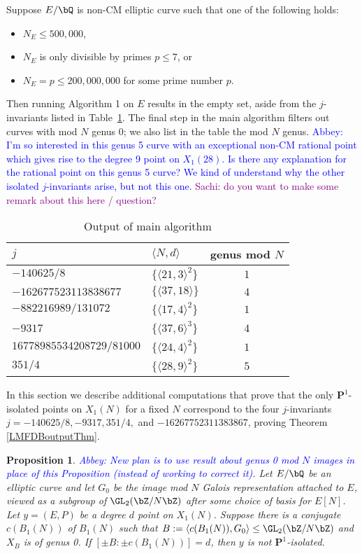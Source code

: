 \documentclass[11pt,reqno]{amsart}
\theoremstyle{plain}
\newtheorem{proposition}[theorem]{Proposition}
\theoremstyle{definition}
\newcommand{\Q}{\bQ}
\newcommand{\Z}{\bZ}
\newcommand{\PP}{\mathbf P}
\newcommand{\abbey}[1]{\textcolor{blue}{Abbey: #1}}
\newcommand{\sachi}[1]{\textcolor{purple}{Sachi: #1}}
\begin{document}
Suppose $E/\Q$ is non-CM elliptic curve such that one of the following holds:
\begin{itemize}
    \item$N_E \leq 500{,}000$,
    \item $N_E$ is only divisible by primes $p \leq 7$, or
    \item $N_E=p \leq 200{,}000{,}000$ for some prime number $p$.
\end{itemize} Then running Algorithm 1 on $E$ results in the empty set, aside from the $j$-invariants listed in Table~\ref{table:imagegt0}. The final step in the main algorithm filters out curves with mod $N$ genus $0$; we also list in the table the mod $N$ genus. \abbey{I'm so interested in this genus 5 curve with an exceptional non-CM rational point which gives rise to the degree 9 point on $X_1(28)$. Is there any explanation for the rational point on this genus 5 curve? We kind of understand why the other isolated $j$-invariants arise, but not this one.} \sachi{do you want to make some remark about this here / question?}
	\begin{table}[h]
	\begin{center}
		\begin{tabularx}{277pt}{l l c} \toprule
		$j$ & $\langle N, d \rangle$ & genus mod $N$  \\\midrule
$-140625/8$ &  $\{ \langle 21, 3 \rangle^2 \} $ & $1$\\
 $-162677523113838677$& $\{ \langle 37, 18 \rangle \}$ & $4$\\
 $-882216989/131072$ & $\{ \langle 17, 4 \rangle^2\}$ & $1$ \\
 $-9317$ & $\{ \langle 37, 6 \rangle^3 \} $ & $4$\\
 $16778985534208729/81000$ & $\{ \langle 24, 4 \rangle^2 \}$ & $1$\\
 $351/4$ & $\{ \langle 28, 9 \rangle^2 \}$ & $5$\\ \bottomrule
		\end{tabularx}
  
		\caption{Output of main algorithm}\label{table:imagegt0}
	\end{center}
\end{table}

In this section we describe additional computations that prove that the only $\PP^1$-isolated points on $X_1(N)$ for a fixed $N$ correspond to the four $j$-invariants $j=-140625/8,-9317,351/4,$ and $ -16267752311383867$, proving Theorem \ref{LMFDBoutputThm}.
\begin{proposition} \abbey{New plan is to use result about genus 0 mod $N$ images in place of this Proposition (instead of working to correct it).}
    Let $E/\Q$ be an elliptic curve and let $G_0$ be the image mod $N$ Galois representation attached to $E$, viewed as a subgroup of $\GL_2(\Z/N\Z)$ after some choice of basis for $E[N]$. Let $y=(E,P)$ be a degree $d$ point on $X_1(N)$. Suppose there is a conjugate $c(B_1(N))$ of $B_1(N)$ such that $B:=\langle c(B_1(N)), G_0 \rangle \leq \GL_2(\Z/N\Z)$ and $X_B$ is of genus 0. If $[\pm B: \pm c(B_1(N))]=d$, then $y$ is not $\PP^1$-isolated.
\end{proposition}
\end{document}
